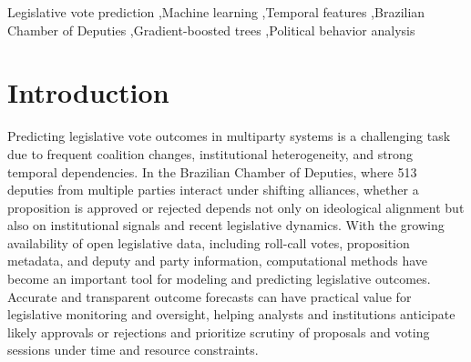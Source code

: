\documentclass[review]{elsarticle}
\begin{document}
\begin{frontmatter}

\begin{abstract}
Legislative vote-outcome prediction in multiparty systems is challenging due to complex coalition dynamics and temporal dependencies. Unlike most prior work that focuses on predicting individual roll-call votes, we address proposition-level outcome prediction, i.e., whether a proposition is approved or rejected in the Brazilian Chamber of Deputies. We propose VOTE-RAP, a feature-based approach that uses leakage-safe temporal and structural features derived from legislative history. We construct a dataset of 8,914 voting sessions from 2003 to 2024 and train an XGBoost classifier evaluated with a chronological 80/20 train--test split. In a reproducible comparison against simple baselines and a state-of-the-art roll-call-based method evaluated in a generalization setting, VOTE-RAP achieves AUROC 0.908 and rejected-class F1 0.703, substantially outperforming both the government-orientation baseline (AUROC 0.739, F1 0.500) and the roll-call-based model (AUROC 0.500, F1 0.000, equivalent to the majority-class baseline). Beyond predictive performance, these results support practical use in legislative monitoring by enabling earlier, leakage-safe signals of approval or rejection that can help prioritize analysis and oversight, strengthening information transparency and decision-making for stakeholders such as oversight institutions, journalists, and civil-society organizations.
\end{abstract}


\begin{keyword}
Legislative vote prediction \sep Machine learning \sep Temporal features \sep Brazilian Chamber of Deputies \sep Gradient-boosted trees \sep Political behavior analysis
\end{keyword}

\end{frontmatter}

\section{Introduction}
\label{introduction}

Predicting legislative vote outcomes in multiparty systems is a challenging task due to frequent coalition changes, institutional heterogeneity, and strong temporal dependencies. In the Brazilian Chamber of Deputies, where 513 deputies from multiple parties interact under shifting alliances, whether a proposition is approved or rejected depends not only on ideological alignment but also on institutional signals and recent legislative dynamics. With the growing availability of open legislative data, including roll-call votes, proposition metadata, and deputy and party information, computational methods have become an important tool for modeling and predicting legislative outcomes. Accurate and transparent outcome forecasts can have practical value for legislative monitoring and oversight, helping analysts and institutions anticipate likely approvals or rejections and prioritize scrutiny of proposals and voting sessions under time and resource constraints.
\end{document}
